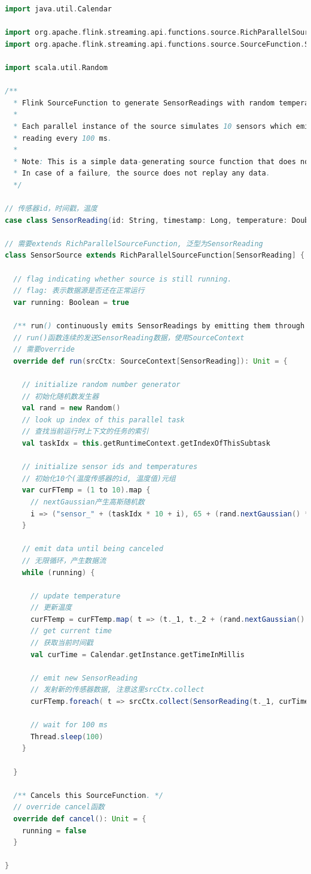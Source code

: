 \documentclass[oneside]{ctexbook}
\begin{document}
\begin{lstlisting}[language=scala, breaklines]
import java.util.Calendar

import org.apache.flink.streaming.api.functions.source.RichParallelSourceFunction
import org.apache.flink.streaming.api.functions.source.SourceFunction.SourceContext

import scala.util.Random

/**
  * Flink SourceFunction to generate SensorReadings with random temperature values.
  *
  * Each parallel instance of the source simulates 10 sensors which emit one sensor
  * reading every 100 ms.
  *
  * Note: This is a simple data-generating source function that does not checkpoint its state.
  * In case of a failure, the source does not replay any data.
  */

// 传感器id，时间戳，温度
case class SensorReading(id: String, timestamp: Long, temperature: Double)

// 需要extends RichParallelSourceFunction, 泛型为SensorReading
class SensorSource extends RichParallelSourceFunction[SensorReading] {

  // flag indicating whether source is still running.
  // flag: 表示数据源是否还在正常运行
  var running: Boolean = true

  /** run() continuously emits SensorReadings by emitting them through the SourceContext. */
  // run()函数连续的发送SensorReading数据，使用SourceContext
  // 需要override
  override def run(srcCtx: SourceContext[SensorReading]): Unit = {

    // initialize random number generator
    // 初始化随机数发生器
    val rand = new Random()
    // look up index of this parallel task
    // 查找当前运行时上下文的任务的索引
    val taskIdx = this.getRuntimeContext.getIndexOfThisSubtask

    // initialize sensor ids and temperatures
    // 初始化10个(温度传感器的id, 温度值)元组
    var curFTemp = (1 to 10).map {
      // nextGaussian产生高斯随机数
      i => ("sensor_" + (taskIdx * 10 + i), 65 + (rand.nextGaussian() * 20))
    }

    // emit data until being canceled
    // 无限循环，产生数据流
    while (running) {

      // update temperature
      // 更新温度
      curFTemp = curFTemp.map( t => (t._1, t._2 + (rand.nextGaussian() * 0.5)) )
      // get current time
      // 获取当前时间戳
      val curTime = Calendar.getInstance.getTimeInMillis

      // emit new SensorReading
      // 发射新的传感器数据, 注意这里srcCtx.collect
      curFTemp.foreach( t => srcCtx.collect(SensorReading(t._1, curTime, t._2)))

      // wait for 100 ms
      Thread.sleep(100)
    }

  }

  /** Cancels this SourceFunction. */
  // override cancel函数
  override def cancel(): Unit = {
    running = false
  }

}
\end{lstlisting}
\end{document}
